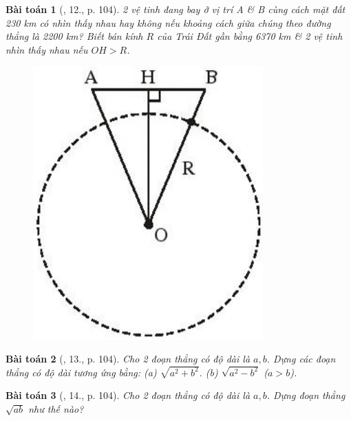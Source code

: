 \documentclass{article}
\newtheorem{baitoan}{Bài toán}
\begin{document}
\begin{baitoan}[\cite{SBT_Toan_9_tap_1}, 12., p. 104]
	2 vệ tinh đang bay ở vị trí A \& B cùng cách mặt đất {\rm230 km} có nhìn thấy nhau hay không nếu khoảng cách giữa chúng theo đường thẳng là {\rm2200 km}? Biết bán kính $R$ của Trái Đất gần bằng {\rm6370 km} \& 2 vệ tinh nhìn thấy nhau nếu $OH > R$.
	\begin{figure}[H]
		\centering
		\includegraphics[scale=.25]{SBT_Toan_9_6_p104}
	\end{figure}
\end{baitoan}

\begin{baitoan}[\cite{SBT_Toan_9_tap_1}, 13., p. 104]
	Cho 2 đoạn thẳng có độ dài là $a,b$. Dựng các đoạn thẳng có độ dài tương ứng bằng: (a) $\sqrt{a^2 + b^2}$. (b) $\sqrt{a^2 - b^2}$ ($a > b$).
\end{baitoan}

\begin{baitoan}[\cite{SBT_Toan_9_tap_1}, 14., p. 104]
	Cho 2 đoạn thẳng có độ dài là $a,b$. Dựng đoạn thẳng $\sqrt{ab}$ như thế nào?
\end{baitoan}
\end{document}
